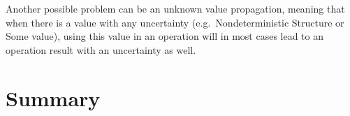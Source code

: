 Another possible problem can be an unknown value propagation, meaning that when there is a value with any uncertainty
(e.g.\ Nondeterministic Structure or Some value), using this value in an operation will in most cases lead to an
operation result with an uncertainty as well.

\section*{Summary}


